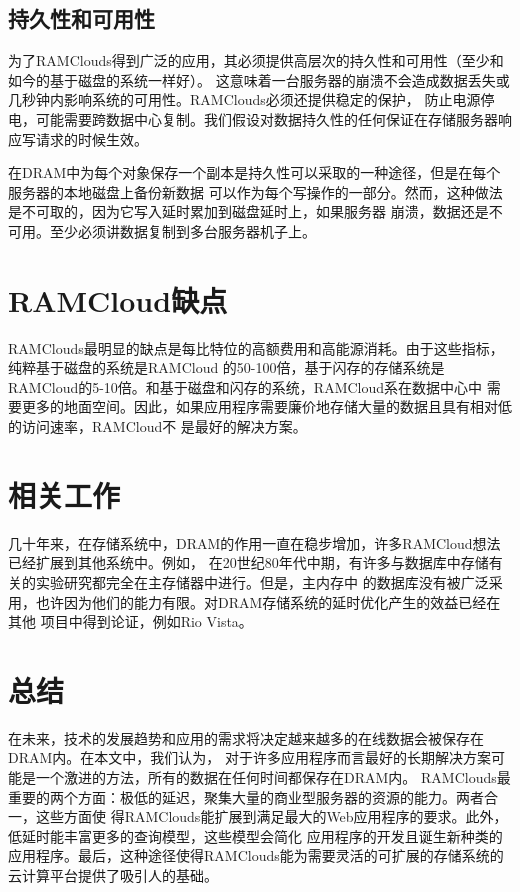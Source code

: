 \documentclass[translation]{zjutreport}
\begin{document}
\section{持久性和可用性}
为了RAMClouds得到广泛的应用，其必须提供高层次的持久性和可用性（至少和如今的基于磁盘的系统一样好）。
这意味着一台服务器的崩溃不会造成数据丢失或几秒钟内影响系统的可用性。RAMClouds必须还提供稳定的保护，
防止电源停电，可能需要跨数据中心复制。我们假设对数据持久性的任何保证在存储服务器响应写请求的时候生效。

在DRAM中为每个对象保存一个副本是持久性可以采取的一种途径，但是在每个服务器的本地磁盘上备份新数据
可以作为每个写操作的一部分。然而，这种做法是不可取的，因为它写入延时累加到磁盘延时上，如果服务器
崩溃，数据还是不可用。至少必须讲数据复制到多台服务器机子上。

\chapter{RAMCloud缺点}
RAMClouds最明显的缺点是每比特位的高额费用和高能源消耗。由于这些指标，纯粹基于磁盘的系统是RAMCloud
的50-100倍，基于闪存的存储系统是RAMCloud的5-10倍。和基于磁盘和闪存的系统，RAMCloud系在数据中心中
需要更多的地面空间。因此，如果应用程序需要廉价地存储大量的数据且具有相对低的访问速率，RAMCloud不
是最好的解决方案。

\chapter{相关工作}
几十年来，在存储系统中，DRAM的作用一直在稳步增加，许多RAMCloud想法已经扩展到其他系统中。例如，
在20世纪80年代中期，有许多与数据库中存储有关的实验研究都完全在主存储器中进行。但是，主内存中
的数据库没有被广泛采用，也许因为他们的能力有限。对DRAM存储系统的延时优化产生的效益已经在其他
项目中得到论证，例如Rio Vista。

\chapter{总结}
在未来，技术的发展趋势和应用的需求将决定越来越多的在线数据会被保存在DRAM内。在本文中，我们认为，
对于许多应用程序而言最好的长期​​解决方案可能是一个激进的方法，所有的数据在任何时间都保存在DRAM内。
RAMClouds最重要的两个方面：极低的延迟，聚集大量的商业型服务器的资源的能力。两者合一，这些方面使
得RAMClouds能扩展到满足最大的Web应用程序的要求。此外，低延时能丰富更多的查询模型，这些模型会简化
应用程序的开发且诞生新种类的应用程序。最后，这种途径使得RAMClouds能为需要灵活的可扩展的存储系统的
云计算平台提供了吸引人的基础。

\backmatter %
\endgroup %

\clearpage %
% 
\nocite{*}                                   %


\end{document}
